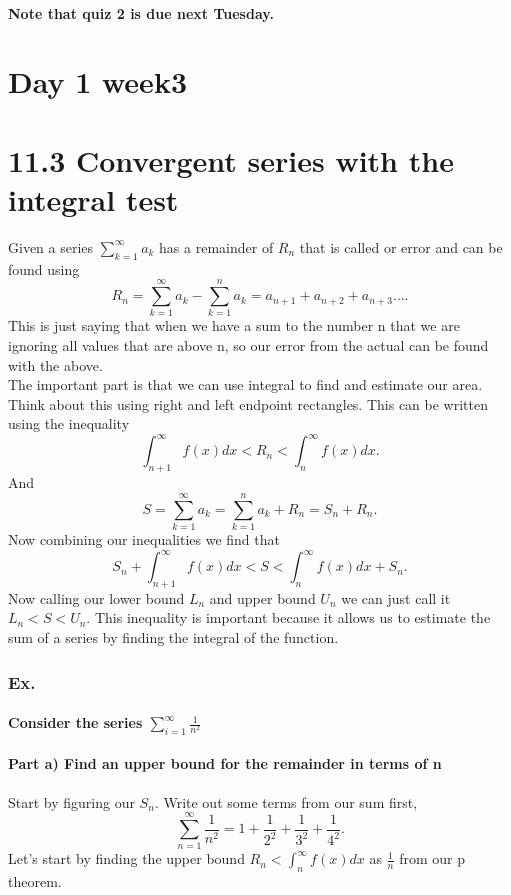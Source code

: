 \paragraph{Note that quiz 2 is due next Tuesday. }
\section{Day 1 week3}%
\label{sec:Day 1 week3}

\section*{11.3 Convergent series with the integral test}%
\label{sec:11.3 Convergent series with the integral test}
Given a series $ \sum_{ k=1 } ^{ \infty } a_k $ has a remainder of $ R_n $ that is called or error and can be found using
\[
R_n = \sum_{ k=1 } ^{ \infty } a_k - \sum_{ k=1 } ^{ n } a_k = a_{ n+1 }+a_{ n+2 }+a_{ n+3 } \ldots
.\] 
This is just saying that when we have a sum to the number n that we are ignoring all values that are above n, so our error from the actual can be found with the above. \\

The important part is that we can use integral to find and estimate our area. Think about this using right and left endpoint rectangles. This can be written using the inequality
\[
\int_{ n+1 }^{ \infty } f\left( x \right) dx<R_n < \int_{ n }^{ \infty } f\left( x \right) dx
.\] 
And 
\[
S=\sum_{ k=1 } ^{ \infty } a_k = \sum_{ k=1 } ^{ n } a_k + R_n = S_n + R_n 
.\] 
Now combining our inequalities we find that 
\[
S_n + \int_{ n+1 }^{ \infty } f\left( x \right) dx<S < \int_{ n }^{ \infty } f\left( x \right) dx+S_n
.\] 
Now calling our lower bound $ L_n $ and upper bound $ U_n $ we can just call it $ L_n < S< U_n $. This inequality is important because it allows us to estimate the sum of a series by finding the integral of the function.


\subsubsection*{Ex. }
\paragraph{Consider the series $ \sum_{ i=1 } ^{ \infty } \frac{ 1 }{ n^2 }  $}
\paragraph{Part a) Find an upper bound for the remainder in terms of n}
Start by figuring our $ S_n $. Write out some terms from our sum first,
\[
\sum_{ n=1 } ^{ \infty } \frac{ 1 }{ n^2 } =1+\frac{ 1 }{ 2^2 } +\frac{ 1 }{ 3^2 } +\frac{ 1 }{ 4^2 } 
.\] 
Let's start by finding the upper bound $ R_n < \int_{ n }^{ \infty } f\left( x \right) dx$ as $ \frac{ 1 }{ n }  $ from our p theorem. 


